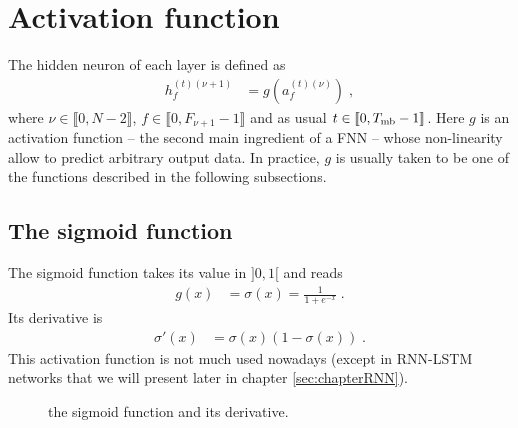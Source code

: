 \section{Activation function}

The hidden neuron of each layer is defined as
\begin{align}
h_{f}^{(t)(\nu+1)}&=g\left(a_{f}^{(t)(\nu)}\right)\;,
\end{align}
where $\nu\in\llbracket 0,N-2\rrbracket$, $f\in \llbracket 0,F_{\nu+1}-1\rrbracket$ and as usual $t \in \llbracket0,T_{{\rm mb}}-1\rrbracket$. Here $g$ is an activation function -- the second main ingredient of a FNN -- whose non-linearity allow to predict arbitrary output data. In practice, $g$ is usually taken to be one of the functions described in the following subsections. 


\subsection{The sigmoid function}

The sigmoid function takes its value in $]0,1[$ and reads
\begin{align}
g(x)&=\sigma(x)=\frac{1}{1+e^{-x}}\;.
\end{align}
Its derivative is
\begin{align}
\sigma'(x)&=\sigma(x)\left(1-\sigma(x)\right)\;.
\end{align}
This activation function is not much used nowadays (except in RNN-LSTM networks that we will present later in chapter \ref{sec:chapterRNN}).

\begin{figure}[H]
\begin{center}
\end{center}
\caption{\label{fig:sigmoid} the sigmoid function and its derivative.}
\end{figure}

